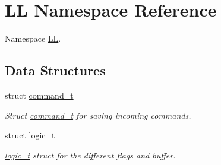\hypertarget{namespace_l_l}{}\section{LL Namespace Reference}
\label{namespace_l_l}


Namespace \mbox{\hyperlink{namespace_l_l}{LL}}.  


\subsection*{Data Structures}
\begin{DoxyCompactItemize}
\item 
struct \mbox{\hyperlink{struct_l_l_1_1command__t}{command\+\_\+t}}
\begin{DoxyCompactList}\small\item\em Struct \mbox{\hyperlink{struct_l_l_1_1command__t}{command\+\_\+t}} for saving incoming commands. \end{DoxyCompactList}\item 
struct \mbox{\hyperlink{struct_l_l_1_1logic__t}{logic\+\_\+t}}
\begin{DoxyCompactList}\small\item\em \mbox{\hyperlink{struct_l_l_1_1logic__t}{logic\+\_\+t}} struct for the different flags and buffer. \end{DoxyCompactList}\end{DoxyCompactItemize}
